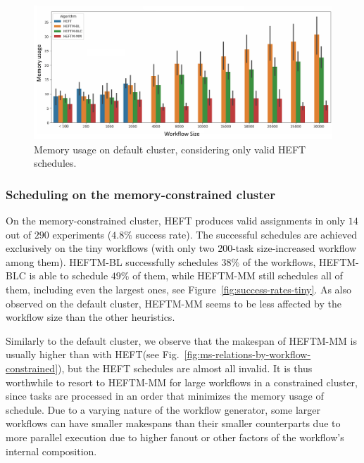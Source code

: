 \documentclass[conference]{IEEEtran}
\newcommand{\algo}[1]{\textsc{#1}}
\newcommand{\heft}{\algo{HEFT}\xspace}
\newcommand{\heftmm}{\algo{HEFTM-MM}\xspace}
\newcommand{\heftbl}{\algo{HEFTM-BL}\xspace}
\newcommand{\heftblc}{\algo{HEFTM-BLC}\xspace}
\newcommand{\new}[1]{{\color{blue}#1}}
\begin{document}
\begin{figure}[tb]
    \centering
    \includegraphics[width=1\columnwidth] {images/mem-usage-normal-onlyvalid2}
    \caption{Memory usage on default cluster, considering only valid \heft schedules. }
    \label{fig:mem-usages-onlyvalid}
\end{figure}



\subsubsection{Scheduling on the memory-constrained cluster}
\label{ss:mem-constrained-cluster}
%
On the memory-constrained cluster, \heft produces valid assignments in only $14$ out of $290$ experiments ($4.8\%$ success rate).
The successful schedules are achieved exclusively on the tiny workflows (with only two 200-task size-increased
workflow among them).
\heftbl successfully schedules $38\%$ of the workflows, \heftblc is able to schedule $49\%$ of them, while \heftmm
still schedules all of them, including even the largest ones, see Figure~\ref{fig:success-rates-tiny}.
As also observed on the default cluster, \heftmm seems to be less affected by the workflow size
than the other heuristics.

Similarly to the default cluster, we observe that the makespan of \heftmm is usually higher
than with \heft (see Fig.~\ref{fig:ms-relations-by-workflow-constrained}), but the \heft schedules are
almost all invalid. It is thus worthwhile to resort to \heftmm for large workflows
in a constrained cluster, since tasks are processed in an order that minimizes
the memory usage of schedule.
\new{Due to a varying nature of the workflow generator, some larger workflows can have smaller makespans than their
smaller counterparts due to more parallel execution due to higher fanout or other factors of the workflow's
internal composition.
}
\end{document}

